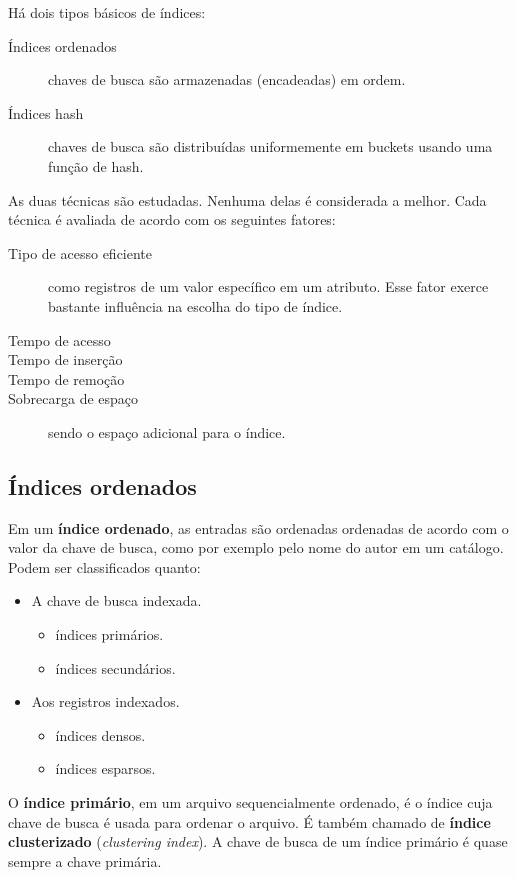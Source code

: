 Há dois tipos básicos de índices:
\begin{description}
\item[Índices ordenados] chaves de busca são armazenadas (encadeadas) em ordem.
\item[Índices hash]  chaves de busca são distribuídas uniformemente
em buckets usando uma função de hash.
\end{description}

As duas técnicas são estudadas. 
Nenhuma delas é considerada a melhor. 
Cada técnica é avaliada de acordo com os seguintes fatores:
\begin{description}
\item[Tipo de acesso eficiente]  como registros de um valor específico em um atributo. Esse fator
exerce bastante influência na escolha do tipo de índice.
\item[Tempo de acesso]
\item[Tempo de inserção]
\item[Tempo de remoção]
\item[Sobrecarga de espaço] sendo o espaço adicional para o índice.
\end{description}

\subsection{Índices ordenados}

Em um \textbf{índice ordenado}, as entradas são ordenadas ordenadas de acordo
com o valor da chave de busca, como por exemplo pelo nome do autor em um catálogo.
Podem ser classificados quanto:
\begin{itemize}
\item A chave de busca indexada.
	\begin{itemize}
	\item índices primários.
	\item índices secundários.
	\end{itemize}
\item Aos registros indexados.
	\begin{itemize}
	\item índices densos.
	\item índices esparsos.
	\end{itemize}
\end{itemize}

O \textbf{índice primário}, em um arquivo sequencialmente ordenado, é o índice
cuja chave de busca é usada para ordenar o arquivo.
É também chamado de \textbf{índice clusterizado} (\emph{clustering index}).
A chave de busca de um índice primário é quase sempre a chave primária.

